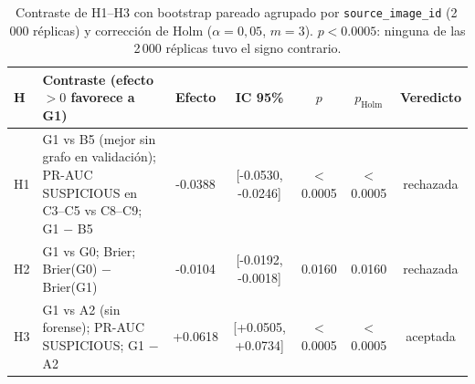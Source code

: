 \begin{table}[H]\centering\footnotesize
\begin{tabularx}{\textwidth}{lXccccc}
\toprule
\textbf{H} & \textbf{Contraste (efecto $>0$ favorece a G1)} & \textbf{Efecto} & \textbf{IC 95\%} & $p$ & $p_{\mathrm{Holm}}$ & \textbf{Veredicto} \\
\midrule
H1 & G1 vs B5 (mejor sin grafo en validación); PR-AUC SUSPICIOUS en C3--C5 vs C8--C9; G1 $-$ B5 & -0.0388 & [-0.0530, -0.0246] & $<$0.0005 & $<$0.0005 & rechazada \\
H2 & G1 vs G0; Brier; Brier(G0) $-$ Brier(G1) & -0.0104 & [-0.0192, -0.0018] & 0.0160 & 0.0160 & rechazada \\
H3 & G1 vs A2 (sin forense); PR-AUC SUSPICIOUS; G1 $-$ A2 & +0.0618 & [+0.0505, +0.0734] & $<$0.0005 & $<$0.0005 & aceptada \\
\bottomrule
\end{tabularx}
\caption[Contraste de hipótesis]{Contraste de H1--H3 con bootstrap pareado agrupado por \texttt{source\_image\_id} (2\,000 réplicas) y corrección de Holm ($\alpha=0{,}05$, $m=3$). $p<0.0005$: ninguna de las 2\,000 réplicas tuvo el signo contrario.}
\label{tab:hipotesis}
\end{table}

